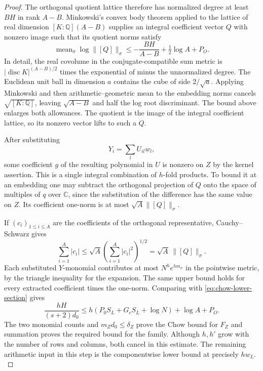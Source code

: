 \begin{proof}
The orthogonal quotient lattice therefore has normalized
degree at least \(BH\) in rank \(A-B\). Minkowski's convex
body theorem applied to the lattice of real dimension
\([K:\mathbb Q](A-B)\) supplies an integral coefficient
vector \(Q\) with nonzero image such that its quotient norms
satisfy
\[
 \operatorname{mean}_\sigma\log\|[Q]\|_\sigma
    \le-\frac{BH}{A-B}+\tfrac12\log A+P_O .
\]
In detail, the real covolume in the conjugate-compatible
sum metric is \(|\operatorname{disc} K|^{(A-B)/2}\)
times the exponential of minus the unnormalized degree.
The Euclidean unit ball in dimension \(a\) contains the
cube of side \(2/\sqrt a\). Applying Minkowski and then
arithmetic--geometric mean to the embedding norms cancels
\(\sqrt{[K:\mathbb Q]}\), leaving \(\sqrt{A-B}\)
and half the log root discriminant. The bound above enlarges
both allowances. The quotient is the image of the integral
coefficient lattice, so its nonzero vector lifts to such a
\(Q\).

After substituting 
\[
  Y_i=\sum_l U_{il}w_l,
\]
 some coefficient
\(g\) of the resulting polynomial in \(U\) is nonzero on
\(Z\) by the kernel assertion. This is a single integral
combination of \(h\)-fold products. To bound it at an embedding
one may subtract the orthogonal projection of \(Q\) onto the
space of multiples of \(q\) over \(\mathbb C\), since the
substitution of the difference has the same value on \(Z\).
Its coefficient one-norm is at most \(\sqrt A\|[Q]\|_\sigma\).

If \((c_i)_{1\le i\le A}\) are the coefficients of the orthogonal representative, Cauchy--Schwarz gives
\[
  \sum_{i=1}^{A}|c_i|\le\sqrt A\left(\sum_{i=1}^{A}|c_i|^2\right)^{1/2}=\sqrt A\,\|[Q]\|_\sigma .
\]
Each substituted \(Y\)-monomial contributes at most
\(N^h e^{h m_\sigma}\) in the pointwise metric, by the
triangle inequality for the expansion. The same upper bound
holds for every extracted coefficient times the one-norm.
Comparing with \eqref{eq:chow-lower-section} gives
\[
 \frac{hH}{(s+2)d_0}\le
 h(P_0 S_L+G_c S_L+\log N)+\log A+P_O .
\]
The two monomial counts and \(m_Zd_0\le\delta_Z\) prove the
Chow bound for \(F_Z\) and summation proves the required
bound for the family. Although \(h,h'\) grow with the number
of rows and columns, both cancel in this estimate. The
remaining arithmetic input in this step is the componentwise
lower bound at precisely \(h w_L\).
\label{cor:slice-chow-1}
\end{proof}
